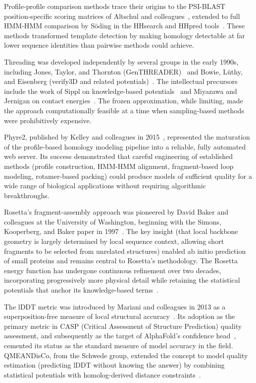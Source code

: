 Profile-profile comparison methods trace their origins to the PSI-BLAST position-specific scoring matrices of Altschul and colleagues~\cite{altschul1997}, extended to full HMM-HMM comparison by S\"oding in the HHsearch and HHpred tools~\cite{soeding2005,zimmermann2018hhsuite}. These methods transformed template detection by making homology detectable at far lower sequence identities than pairwise methods could achieve.

Threading was developed independently by several groups in the early 1990s, including Jones, Taylor, and Thornton (GenTHREADER)~\cite{jones1999} and Bowie, L\"uthy, and Eisenberg (verify3D and related potentials)~\cite{bowie1991}. The intellectual precursors include the work of Sippl on knowledge-based potentials~\cite{sippl1990} and Miyazawa and Jernigan on contact energies~\cite{miyazawa1985}. The frozen approximation, while limiting, made the approach computationally feasible at a time when sampling-based methods were prohibitively expensive.

Phyre2, published by Kelley and colleagues in 2015~\cite{kelley2015}, represented the maturation of the profile-based homology modeling pipeline into a reliable, fully automated web server. Its success demonstrated that careful engineering of established methods (profile construction, HMM-HMM alignment, fragment-based loop modeling, rotamer-based packing) could produce models of sufficient quality for a wide range of biological applications without requiring algorithmic breakthroughs.

Rosetta's fragment-assembly approach was pioneered by David Baker and colleagues at the University of Washington, beginning with the Simons, Kooperberg, and Baker paper in 1997~\cite{simons1997}. The key insight (that local backbone geometry is largely determined by local sequence context, allowing short fragments to be selected from unrelated structures) enabled ab initio prediction of small proteins and remains central to Rosetta's methodology. The Rosetta energy function has undergone continuous refinement over two decades, incorporating progressively more physical detail while retaining the statistical potentials that anchor its knowledge-based terms~\cite{rohl2004}.

The lDDT metric was introduced by Mariani and colleagues in 2013 as a superposition-free measure of local structural accuracy~\cite{mariani2013}. Its adoption as the primary metric in CASP (Critical Assessment of Structure Prediction) quality assessment, and subsequently as the target of AlphaFold's confidence head~\cite{jumper2021}, cemented its status as the standard measure of model accuracy in the field. QMEANDisCo, from the Schwede group, extended the concept to model quality estimation (predicting lDDT without knowing the answer) by combining statistical potentials with homolog-derived distance constraints~\cite{studer2020}.

